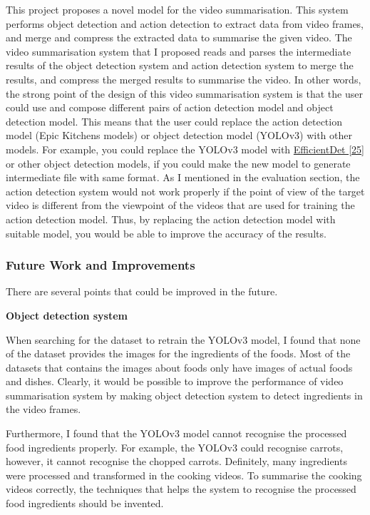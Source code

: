 \documentclass{article}
\begin{document}
This project proposes a novel model for the video summarisation. This system performs object detection and action detection to extract data from video frames, and merge and compress the extracted data to summarise the given video. The video summarisation system that I proposed reads and parses the intermediate results of the object detection system and action detection system to merge the results, and compress the merged results to summarise the video. In other words, the strong point of the design of this video summarisation system is that the user could use and compose different pairs of action detection model and object detection model. This means that the user could replace the action detection model (Epic Kitchens models) or object detection model (YOLOv3) with other models. For example, you could replace the YOLOv3 model with \hyperlink{ref8}{EfficientDet [25]} or other object detection models, if you could make the new model to generate intermediate file with same format. As I mentioned in the evaluation section, the action detection system would not work properly if the point of view of the target video is different from the viewpoint of the videos that are used for training the action detection model. Thus, by replacing the action detection model with suitable model, you would be able to improve the accuracy of the results.

\subsubsection{Future Work and Improvements}

There are several points that could be improved in the future.\newline

\textbf{Object detection system}

When searching for the dataset to retrain the YOLOv3 model, I found that none of the dataset provides the images for the ingredients of the foods. Most of the datasets that contains the images about foods only have images of actual foods and dishes. Clearly, it would be possible to improve the performance of video summarisation system by making object detection system to detect ingredients in the video frames.

Furthermore, I found that the YOLOv3 model cannot recognise the processed food ingredients properly. For example, the YOLOv3 could recognise carrots, however, it cannot recognise the chopped carrots. Definitely, many ingredients were processed and transformed in the cooking videos. To summarise the cooking videos correctly, the techniques that helps the system to recognise the processed food ingredients should be invented.\newline\newline
\end{document}
